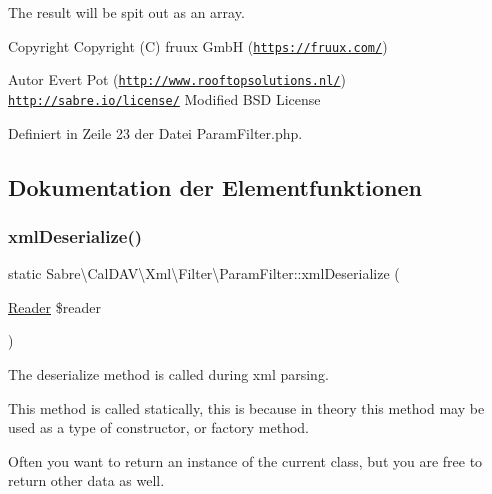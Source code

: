 The result will be spit out as an array.

\begin{DoxyCopyright}{Copyright}
Copyright (C) fruux GmbH (\href{https://fruux.com/}{\tt https\+://fruux.\+com/}) 
\end{DoxyCopyright}
\begin{DoxyAuthor}{Autor}
Evert Pot (\href{http://www.rooftopsolutions.nl/}{\tt http\+://www.\+rooftopsolutions.\+nl/})  \href{http://sabre.io/license/}{\tt http\+://sabre.\+io/license/} Modified B\+SD License 
\end{DoxyAuthor}


Definiert in Zeile 23 der Datei Param\+Filter.\+php.



\subsection{Dokumentation der Elementfunktionen}
\mbox{\label{class_sabre_1_1_cal_d_a_v_1_1_xml_1_1_filter_1_1_param_filter_a89565cd2892a56a90868b89300d2ccc0}} 
\subsubsection{\texorpdfstring{xml\+Deserialize()}{xmlDeserialize()}}
{\footnotesize\ttfamily static Sabre\textbackslash{}\+Cal\+D\+A\+V\textbackslash{}\+Xml\textbackslash{}\+Filter\textbackslash{}\+Param\+Filter\+::xml\+Deserialize (\begin{DoxyParamCaption}\item[{\mbox{\hyperlink{class_sabre_1_1_xml_1_1_reader}{Reader}}}]{\$reader }\end{DoxyParamCaption})\hspace{0.3cm}{\ttfamily [static]}}

The deserialize method is called during xml parsing.

This method is called statically, this is because in theory this method may be used as a type of constructor, or factory method.

Often you want to return an instance of the current class, but you are free to return other data as well.

